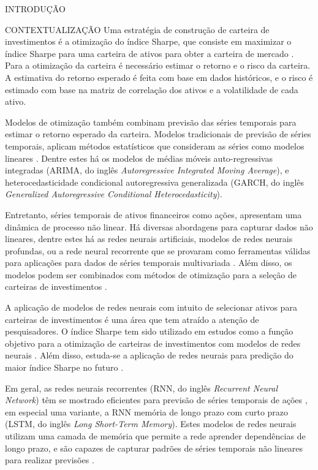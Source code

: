 \begin{section}{INTRODUÇÃO}
\begin{subsection}{CONTEXTUALIZAÇÃO}
        \ipar Uma estratégia de construção de carteira de investimentos é a otimização do índice Sharpe, que consiste em maximizar o índice Sharpe para uma carteira de ativos para obter a carteira de mercado \cite{maree2022balancing}. Para a otimização da carteira é necessário estimar o retorno e o risco da carteira. A estimativa do retorno esperado é feita com base em dados históricos, e o risco é estimado com base na matriz de correlação dos ativos e a volatilidade de cada ativo.

        \ipar Modelos de otimização também combinam previsão das séries temporais para estimar o retorno esperado da carteira. Modelos tradicionais de previsão de séries temporais, aplicam métodos estatísticos que consideram as séries como modelos lineares \cite{zhou2023twostage}. Dentre estes há os modelos de médias móveis auto-regressivas integradas (\acrshort{ARIMA}, do inglês \textit{Autoregressive Integrated Moving Average}), e heterocedasticidade condicional autoregressiva generalizada (\acrshort{GARCH}, do inglês \textit{Generalized Autoregressive Conditional Heterocedasticity}). 
        
        \ipar Entretanto, séries temporais de ativos financeiros como ações, apresentam uma dinâmica de processo não linear. Há diversas abordagens para capturar dados não lineares, dentre estes há as redes neurais artificiais, modelos de redes neurais profundas, ou a rede neural recorrente que se provaram como ferramentas válidas para aplicações para dados de séries temporais multivariada \cite{cao2020delafo}. Além disso, os modelos podem ser combinados com métodos de otimização para a seleção de carteiras de investimentos \cite{du2022mean}.

        \ipar A aplicação de modelos de redes neurais com intuito de selecionar ativos para carteiras de investimentos é uma área que tem atraído a atenção de pesquisadores. O índice Sharpe tem sido utilizado em estudos como a função objetivo para a otimização de carteiras de investimentos com modelos de redes neurais \cite{tran2023optimizing}. Além disso, estuda-se a aplicação de redes neurais para predição do maior índice Sharpe no futuro \cite{vukovic2020neural}.

        \ipar Em geral, as redes neurais recorrentes (\acrshort{RNN}, do inglês \textit{Recurrent Neural Network}) têm se mostrado eficientes para previsão de séries temporais de ações \cite{wang2020portfolio}, em especial uma variante, a \acrshort{RNN} memória de longo prazo com curto prazo (\acrshort{LSTM}, do inglês \textit{Long Short-Term Memory}). Estes modelos de redes neurais utilizam uma camada de memória que permite a rede aprender dependências de longo prazo, e são capazes de capturar padrões de séries temporais não lineares para realizar previsões \cite{hochreiter1997long}.


\end{subsection}
\end{section}
